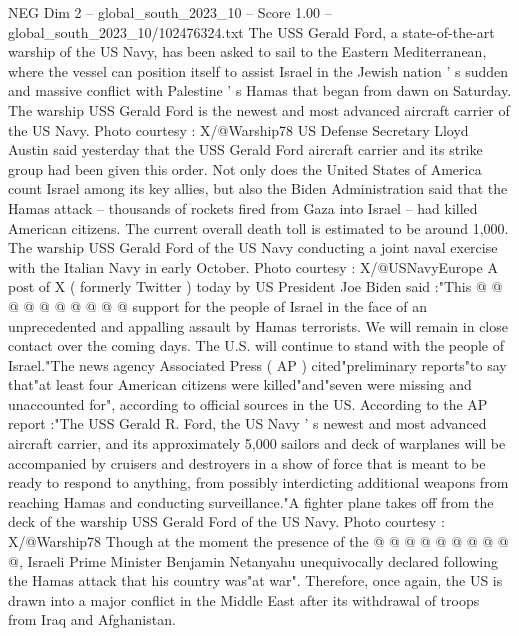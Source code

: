 \begin{textsample}{NEG Dim 2 – global\_south\_2023\_10 – Score 1.00 – global\_south\_2023\_10/102476324.txt}  \label{ex:f2_neg_270}
The USS Gerald Ford, a state-of-the-art warship of the US Navy, has been asked to sail to the Eastern Mediterranean, where the vessel can position itself to assist Israel in the Jewish nation ' s sudden and massive conflict with Palestine ' s Hamas that began from dawn on Saturday.
The warship USS Gerald Ford is the newest and most advanced aircraft carrier of the US Navy.
Photo courtesy : X/@Warship78 US Defense Secretary Lloyd Austin said yesterday that the USS Gerald Ford aircraft carrier and its strike group had been given this order.
Not only does the United States of America count Israel among its key allies, but also the Biden Administration said that the Hamas attack -- thousands of rockets fired from Gaza into Israel -- had killed American citizens.
The current overall death toll is estimated to be around 1,000.
The warship USS Gerald Ford of the US Navy conducting a joint naval exercise with the Italian Navy in early October.
Photo courtesy : X/@USNavyEurope A post of X ( formerly Twitter ) today by US President Joe Biden said :"This @ @ @ @ @ @ @ @ @ @ support for the people of Israel in the face of an unprecedented and appalling assault by Hamas terrorists.
We will remain in close contact over the coming days.
The U.S. will continue to stand with the people of Israel."The news agency Associated Press ( AP ) cited"preliminary reports"to say that"at least four American citizens were killed"and"seven were missing and unaccounted for", according to official sources in the US.
According to the AP report :"The USS Gerald R.
Ford, the US Navy ' s newest and most advanced aircraft carrier, and its approximately 5,000 sailors and deck of warplanes will be accompanied by cruisers and destroyers in a show of force that is meant to be ready to respond to anything, from possibly interdicting additional weapons from reaching Hamas and conducting surveillance."A fighter plane takes off from the deck of the warship USS Gerald Ford of the US Navy.
Photo courtesy : X/@Warship78 Though at the moment the presence of the @ @ @ @ @ @ @ @ @ @, Israeli Prime Minister Benjamin Netanyahu unequivocally declared following the Hamas attack that his country was"at war".
Therefore, once again, the US is drawn into a major conflict in the Middle East after its withdrawal of troops from Iraq and Afghanistan.

\end{textsample}
